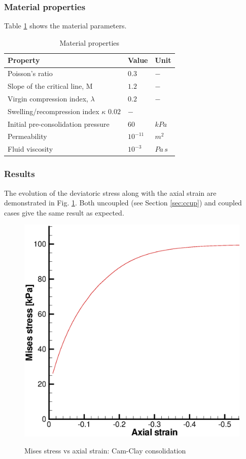 \subsubsection*{Material properties}
Table \ref{ex3_table1} shows the material parameters.
\begin{table}[htb]
\centering
\label{ex3_table1}
%
%
\begin{tabular}{lll}
\hline\hline
Property & Value & Unit \\
\hline
Poisson's ratio & $0.3$       & $-$ \\
Slope of the critical line, M & $1.2$       & $-$ \\
Virgin compression index, $\lambda$ & $0.2$       & $-$ \\
Swelling/recompression index $\kappa$ $0.02$       & $-$ \\
Initial pre-consolidation pressure & $60$       & $kPa$ \\
Permeability    & $10^{-11}$        & $m^2$ \\
Fluid viscosity & $10^{-3}$         & $Pa\,s$ \\
\hline\hline
\end{tabular}
\caption{Material properties}
\end{table}
\subsubsection*{Results}
The evolution of the deviatoric stress along with the axial strain
are demonstrated in Fig. \ref{ex3_q_e}. Both uncoupled (see Section \ref{sec:ccup}) and coupled
cases give the same result as expected\cite{SheSloYu00}.
\begin{figure}[H]
  \begin{center}
    \includegraphics[scale=0.4]{HM/HM_CC/ex3_c_q_e.eps}\\
  \end{center}
  \caption{ Mises stress vs axial strain: Cam-Clay consolidation}
  \label{ex3_q_e}
\end{figure}
